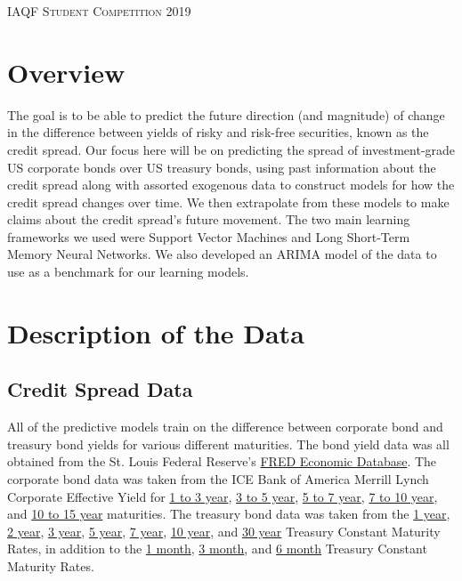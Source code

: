 \documentclass[12pt]{article}
\begin{document}
\begin{center}
    \textsc{IAQF Student Competition 2019}
\end{center}

\section{Overview}
The goal is to be able to predict the future direction (and magnitude) of change in the difference between yields of risky and risk-free securities, known as the credit spread.
Our focus here will be on predicting the spread of investment-grade US corporate bonds over US treasury bonds,
using past information about the credit spread along with assorted exogenous data to construct models for how the credit spread changes over time.
We then extrapolate from these models to make claims about the credit spread's future movement.
The two main learning frameworks we used were Support Vector Machines and Long Short-Term Memory Neural Networks.
We also developed an ARIMA model of the data to use as a benchmark for our learning models.

\section{Description of the Data}
    \subsection{Credit Spread Data}
        All of the predictive models train on the difference between corporate bond and treasury bond yields for various different maturities.
        The bond yield data was all obtained from the St. Louis Federal Reserve's \href{https://fred.stlouisfed.org}{FRED Economic Database}.
        The corporate bond data was taken from the ICE Bank of America Merrill Lynch Corporate Effective Yield for
        \href{https://fred.stlouisfed.org/series/BAMLC1A0C13YEY}{1 to 3 year},
        \href{https://fred.stlouisfed.org/series/BAMLC2A0C35YEY}{3 to 5 year},
        \href{https://fred.stlouisfed.org/series/BAMLC3A0C57YEY}{5 to 7 year},
        \href{https://fred.stlouisfed.org/series/BAMLC4A0C710YEY}{7 to 10 year}, and
        \href{https://fred.stlouisfed.org/series/BAMLC7A0C1015YEY}{10 to 15 year} maturities.
        The treasury bond data was taken from the
        \href{https://fred.stlouisfed.org/series/DGS1}{1 year},
        \href{https://fred.stlouisfed.org/series/DGS2}{2 year},
        \href{https://fred.stlouisfed.org/series/DGS3}{3 year},
        \href{https://fred.stlouisfed.org/series/DGS5}{5 year},
        \href{https://fred.stlouisfed.org/series/DGS7}{7 year},
        \href{https://fred.stlouisfed.org/series/DGS10}{10 year}, and
        \href{https://fred.stlouisfed.org/series/DGS30}{30 year} Treasury Constant Maturity Rates, in addition to the
        \href{https://fred.stlouisfed.org/series/DGS1MO}{1 month},
        \href{https://fred.stlouisfed.org/series/DGS3MO}{3 month}, and
        \href{https://fred.stlouisfed.org/series/DGS6MO}{6 month} Treasury Constant Maturity Rates.
\end{document}
